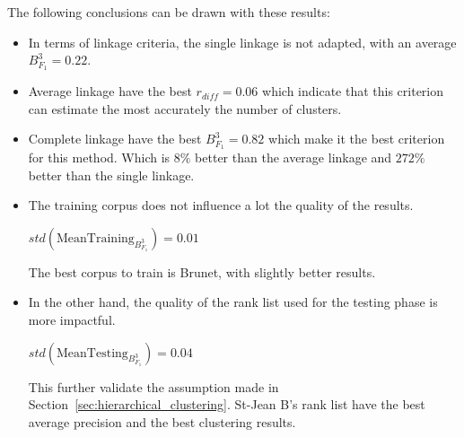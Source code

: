 The following conclusions can be drawn with these results:
\begin{itemize}
  \item
  In terms of linkage criteria, the single linkage is not adapted, with an average $B^3_{F_1} = 0.22$.
  \item
  Average linkage have the best $r_{diff} = 0.06$ which indicate that this criterion can estimate the most accurately the number of clusters.
  \item
  Complete linkage have the best $B^3_{F_1} = 0.82$ which make it the best criterion for this method. Which is $8\%$ better than the average linkage and $272\%$ better than the single linkage.
  \item
  The training corpus does not influence a lot the quality of the results.

  $std(\mathrm{MeanTraining}_{B^3_{F_1}}) = 0.01$

  The best corpus to train is Brunet, with slightly better results.
  \item
  In the other hand, the quality of the rank list used for the testing phase is more impactful.

  $std(\mathrm{MeanTesting}_{B^3_{F_1}}) = 0.04$

  This further validate the assumption made in Section~\ref{sec:hierarchical_clustering}.
  St-Jean B's rank list have the best average precision and the best clustering results.
\end{itemize}

